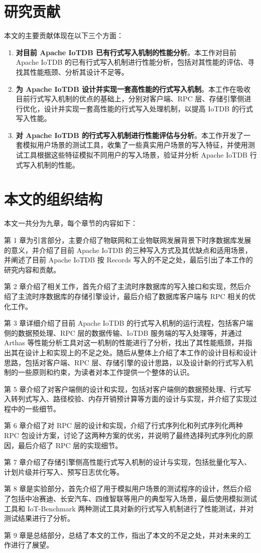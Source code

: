 \section{研究贡献}
本文的主要贡献体现在以下三个方面：
\begin{enumerate}
  \item \textbf{对目前 Apache IoTDB 已有行式写入机制的性能分析}。本工作对目前 Apache IoTDB 的已有行式写入机制进行性能分析，包括对其性能的评估、寻找其性能瓶颈、分析其设计不足等。
  \item \textbf{为 Apache IoTDB 设计并实现一套高性能的行式写入机制}。本工作在吸收目前行式写入机制的优点的基础上，分别对客户端、RPC 层、存储引擎侧进行优化，设计并实现一套高性能的行式写入处理机制，以提高 IoTDB 的行式写入性能。
  \item \textbf{对 Apache IoTDB 的行式写入机制进行性能评估与分析}。本工作开发了一套模拟用户场景的测试工具，收集了一些真实用户场景的写入特征，并使用测试工具根据这些特征模拟不同用户的写入场景，验证并分析 Apache IoTDB 行式写入机制的性能。
\end{enumerate}

\section{本文的组织结构}

本文一共分为九章，每个章节的内容如下：

第 1 章为引言部分，主要介绍了物联网和工业物联网发展背景下时序数据库发展的意义，并介绍了目前 Apache IoTDB 的三种写入方式及其优缺点和适用场景，并阐述了目前 Apache IoTDB 按 Records 写入的不足之处，最后引出了本工作的研究内容和贡献。

第 2 章介绍了相关工作，首先介绍了主流时序数据库的写入接口和实现，然后介绍了主流时序数据库的存储引擎设计，最后介绍了数据库客户端与 RPC 相关的优化工作。

第 3 章详细介绍了目前 Apache IoTDB 的行式写入机制的运行流程，包括客户端侧的数据预处理、RPC 层的数据传输、IoTDB 服务端的写入处理等，并通过 Arthas 等性能分析工具对这一机制的性能进行了分析，找出了其性能瓶颈，并指出其在设计上和实现上的不足之处。随后从整体上介绍了本工作的设计目标和设计思路，包括对客户端、RPC 层、存储引擎的设计思路，以及设计新的行式写入机制的一些原则和约束，为读者对本工作提供一个整体的认识。

第 5 章介绍了对客户端侧的设计和实现，包括对客户端侧的数据预处理、行式写入转列式写入、路径校验、内存开销预计算等方面的设计与实现，并介绍了实现过程中的一些细节。

第 6 章介绍了对 RPC 层的设计和实现，介绍了行式序列化和列式序列化两种 RPC 包设计方案，讨论了这两种方案的优劣，并说明了最终选择列式序列化的原因，最后介绍了 RPC 层的实现细节。

第 7 章介绍了存储引擎侧高性能行式写入机制的设计与实现，包括批量化写入、计划片级并行写入、预写日志优化等。

第 8 章是实验部分，首先介绍了用于模拟用户场景的测试程序的设计，然后介绍了包括中冶赛迪、长安汽车、四维智联等用户的典型写入场景，最后使用模拟测试工具和 IoT-Benchmark\cite{liu2019benchmarking} 两种测试工具对新的行式写入机制进行了性能测试，并对测试结果进行了分析。

第 9 章是总结部分，总结了本文的工作，指出了本文的不足之处，并对未来的工作进行了展望。